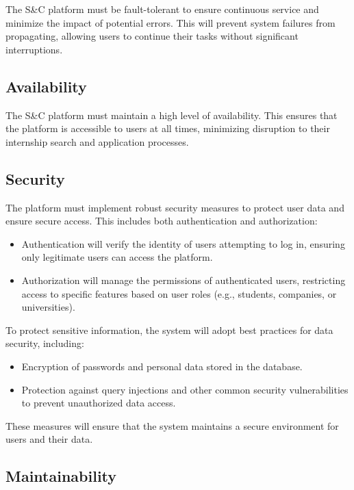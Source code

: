 The S\&C platform must be fault-tolerant to ensure continuous service
and minimize the impact of potential errors. This will prevent system
failures from propagating, allowing users to continue their tasks
without significant interruptions.


\subsection{Availability}
\label{subsec:availability}%


The S\&C platform must maintain a high level of availability. This
ensures that the platform is accessible to users at all times,
minimizing disruption to their internship search and application
processes.~


\subsection{Security}
\label{subsec:security}%


The platform must implement robust security measures to protect user
data and ensure secure access. This includes both authentication and
authorization:

\begin{itemize}
\item
  Authentication will verify the identity of users attempting to log in,
  ensuring only legitimate users can access the platform.
\item
  Authorization will manage the permissions of authenticated users,
  restricting access to specific features based on user roles (e.g.,
  students, companies, or universities).
\end{itemize}

To protect sensitive information, the system will adopt best practices
for data security, including:

\begin{itemize}
\item
  Encryption of passwords and personal data stored in the database.
\item
  Protection against query injections and other common security
  vulnerabilities to prevent unauthorized data access.
\end{itemize}

These measures will ensure that the system maintains a secure
environment for users and their data.


\subsection{Maintainability}
\label{subsec:maintainability}%


